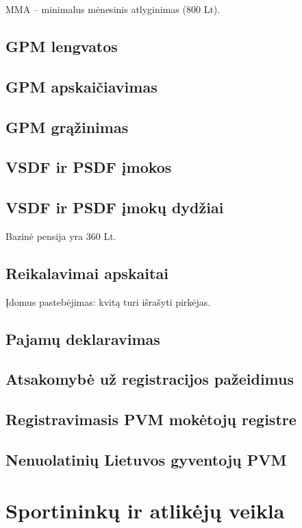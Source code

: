 MMA – minimalus mėnesinis atlyginimas (800 Lt).

\subsection{GPM lengvatos}

\subsection{GPM apskaičiavimas}

\subsection{GPM grąžinimas}

\subsection{VSDF ir PSDF įmokos}

\subsection{VSDF ir PSDF įmokų dydžiai}
Bazinė pensija yra 360 Lt.

\subsection{Reikalavimai apskaitai}

Įdomus pastebėjimas: kvitą turi išrašyti pirkėjas.

\subsection{Pajamų deklaravimas}

\subsection{Atsakomybė už registracijos pažeidimus}

\subsection{Registravimasis PVM mokėtojų registre}

\subsection{Nenuolatinių Lietuvos gyventojų PVM}

\section{Sportininkų ir atlikėjų veikla}

